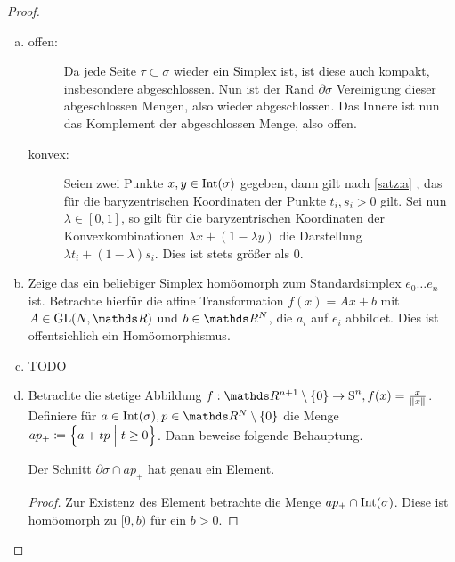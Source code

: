 \begin{Satz}
\begin{proof}
\begin{enumerate}[a):]
\begin{description}
     \end{description}
      \item \begin{description}
        \item[offen:] Da jede Seite $\tau \subset \sigma$ wieder ein
          Simplex ist, ist diese auch kompakt, insbesondere
          abgeschlossen. Nun ist der Rand $\partial\sigma$ Vereinigung
          dieser abgeschlossen Mengen, also wieder abgeschlossen. Das
          Innere ist nun das Komplement der abgeschlossen Menge, also
          offen.
            \item[konvex:] Seien zwei Punkte $x,y \in \operatorname{Int}(\sigma)$ gegeben, dann 
              gilt nach \cref{satz:a} , das für die baryzentrischen
              Koordinaten der Punkte $t_i,s_i >0$ gilt. Sei nun
              $\lambda \in [0,1]$, so gilt für die baryzentrischen
              Koordinaten der Konvexkombinationen
              $\lambda x + (1-\lambda y)$ die Darstellung
              $\lambda t_i + (1-\lambda)s_i$. Dies ist stets größer
              als $0$.
        \end{description}
      \item Zeige das ein beliebiger Simplex homöomorph zum
        Standardsimplex $e_0\ldots e_n$ ist. Betrachte hierfür die
        affine Transformation $f(x) = Ax+b$ mit $A \in \GL(N,\R)$ und
        $b \in \R^N$, die $a_i$ auf $e_i$ abbildet. Dies ist
        offentsichlich ein Homöomorphismus.
    \item TODO
    \item Betrachte die stetige Abbildung
      $f : \R^{n+1} \setminus \sset{0} \rightarrow \Sp^n, f(x) = \frac{x}{\nn[x]}$.
      Definiere für $a \in \Int(\sigma), p \in \R^N \setminus \{ 0 \}$ die Menge
      $ap_+ \coloneqq \left\{  a + tp \; \Big| \;  t \geq 0 \right\}$. Dann beweise folgende Behauptung.
      \begin{Beh}
        Der Schnitt $\partial\sigma \cap ap_+$ hat genau ein Element.
        \begin{proof}
          Zur Existenz des Element betrachte die Menge $ap_+ \cap \operatorname{Int}(\sigma)$.
          Diese ist homöomorph zu $[0,b)$ für ein $b>0$. 
        \end{proof}
      \end{Beh}
    \end{enumerate}
  \end{proof}
\end{Satz}

